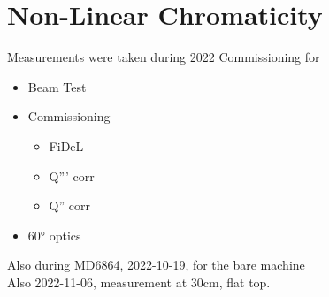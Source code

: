\section{Non-Linear Chromaticity}

Measurements were taken during 2022 Commissioning for 
\begin{itemize}
    \item Beam Test
    \item Commissioning
    \begin{itemize}
        \item FiDeL
        \item Q''' corr
        \item Q'' corr
    \end{itemize}
    \item 60° optics
\end{itemize}

Also during MD6864, 2022-10-19, for the bare machine \\
Also 2022-11-06, measurement at 30cm, flat top.
